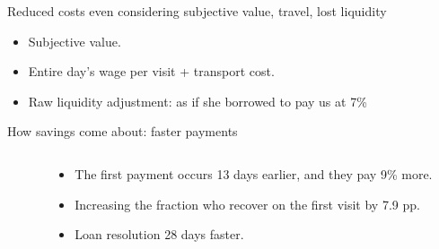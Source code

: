 \documentclass[9pt, aspectratio=169]{beamer}
\begin{document}
\begin{frame}{Reduced costs even considering subjective value, travel, lost liquidity }

\vspace{-.1in}
\begin{itemize}
    \item Subjective value.
    \item Entire day's wage per visit + transport cost.
    \item Raw liquidity adjustment: as if she borrowed to pay us at 7\%  %
\end{itemize}
\begin{table}[H]
\label{table_robustness_fc}
\begin{center}
\resizebox{0.85\textwidth}{!}{
\small{}
}
\end{center}
 \scriptsize 
\end{table}
\end{frame}


\begin{frame}{How savings come about: faster payments}
\begin{columns}
\begin{column}{.45\textwidth}
\begin{table}[H]
\begin{center}
\scriptsize{}
\end{center}
\end{table}
\end{column}
\begin{column}{.45\textwidth}
   \begin{itemize}
     \item The first payment occurs 13 days earlier, and they pay 9\% more.
     \vspace{.2in}
     \vfill \item Increasing the fraction who recover on the first visit by 7.9 pp. 
     \vspace{.2in}
     \vfill  \item Loan resolution 28 days faster.
\end{itemize} 
\end{column}
\end{columns}
\end{frame}
\end{document}
